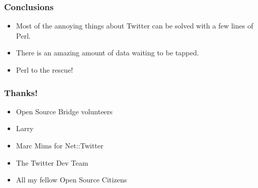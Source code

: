 \documentclass[12pt]{beamer}
\begin{document}
\begin{frame}[fragile]
    \frametitle{Conclusions}
    \begin{itemize}
    \item Most of the annoying things about Twitter can be solved with a few lines of Perl.
    \item There is an amazing amount of data waiting to be tapped.
    \item Perl to the rescue!
    \end{itemize}

\end{frame}

\begin{frame}[fragile]
    \frametitle{Thanks!}
    \begin{itemize}
    \item Open Source Bridge volunteers
    \item Larry
    \item Marc Mims for Net::Twitter
    \item The Twitter Dev Team
    \item All my fellow Open Source Citizens
    \end{itemize}
\end{frame}
\end{document}
